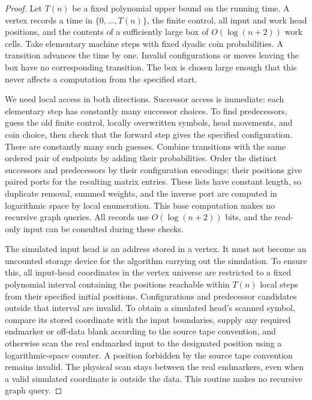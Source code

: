 \begin{proof}
Let $T(n)$ be a fixed polynomial upper bound on the running time.
A vertex records a time in $\{0,\ldots,T(n)\}$, the finite control,
all input and work head positions, and the contents of a sufficiently
large box of $O(\log(n+2))$ work cells. Take elementary machine steps
with fixed dyadic coin probabilities. A transition advances the time
by one. Invalid configurations or moves leaving the box have no
corresponding transition. The box is chosen large enough that this
never affects a computation from the specified start.

We need local access in both directions. Successor access is immediate: each elementary step has constantly many successor choices.
To find predecessors, guess the old finite control, locally overwritten
symbols, head movements, and coin choice, then check that the forward
step gives the specified configuration. There are constantly many such
guesses. Combine transitions with the same ordered pair of endpoints
by adding their probabilities. Order the distinct successors and
predecessors by their configuration encodings; their positions give
paired ports for the resulting matrix entries. These lists have
constant length, so duplicate removal, summed weights, and the inverse
port are computed in logarithmic space by local enumeration. This
base computation makes no recursive graph queries. All records use
$O(\log(n+2))$ bits, and the read-only input can be consulted during
these checks.

The simulated input head is an address stored in a vertex. It must not become an uncounted storage device for the algorithm carrying out the simulation. To ensure this, all input-head coordinates in the vertex universe are restricted to a
fixed polynomial interval containing the positions reachable within
$T(n)$ local steps from their specified initial positions. Configurations
and predecessor candidates outside that interval are invalid. To obtain
a simulated head's scanned symbol, compare its stored coordinate with
the input boundaries, supply any required endmarker or off-data blank
according to the source tape convention, and otherwise scan the real
endmarked input to the designated position using a logarithmic-space
counter. A position forbidden by the source tape convention remains
invalid. The physical scan stays between the real endmarkers, even when
a valid simulated coordinate is outside the data. This routine makes
no recursive graph query.


\end{proof}
